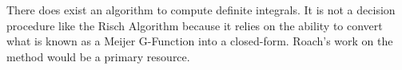 There does exist an algorithm to compute definite integrals.  It is not
a decision procedure like the Risch Algorithm because it relies on the
ability to convert what is known as a Meijer G-Function into a
closed-form.  Roach's work on the method \cite{roach1997meijerg} would
be a primary resource.  